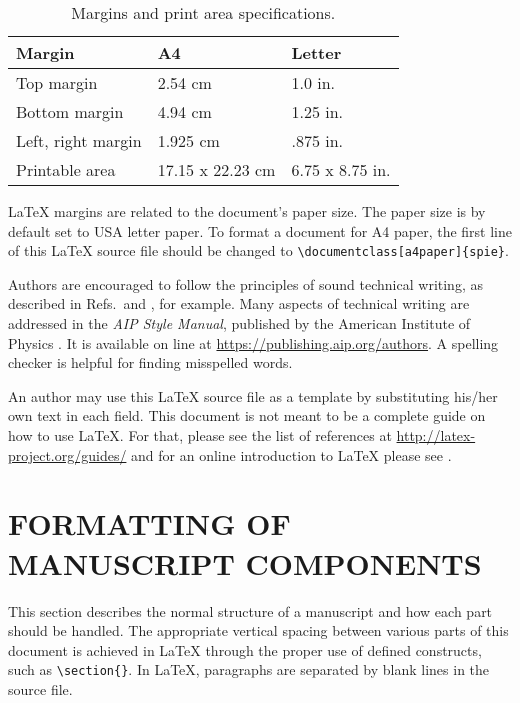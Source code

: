 \documentclass[]{spie}  %
\providecommand{\DIFdeltex}[1]{{\protect\color{mygrey}\scriptsize{#1}}}                       %
\providecommand{\DIFaddbegin}{} %
\providecommand{\DIFaddend}{} %
\providecommand{\DIFdelbegin}{} %
\providecommand{\DIFdelend}{} %
\providecommand{\DIFdel}[1]{\texorpdfstring{\DIFdeltex{#1}}{}} %
\newcommand{\DIFscaledelfig}{0.5}
\newlength{\DIFdelgraphicswidth} %
\newlength{\DIFdelgraphicsheight} %
\newcommand{\DIFaddincludegraphics}[2][]{{\color{blue}\fbox{\DIFOincludegraphics[#1]{#2}}}} %
\newcommand{\DIFdelincludegraphics}[2][]{%
\sbox{\DIFdelgraphicsbox}{\DIFOincludegraphics[#1]{#2}}%
\settoboxwidth{\DIFdelgraphicswidth}{\DIFdelgraphicsbox} %
\settoboxtotalheight{\DIFdelgraphicsheight}{\DIFdelgraphicsbox} %
\scalebox{\DIFscaledelfig}{%
\parbox[b]{\DIFdelgraphicswidth}{\usebox{\DIFdelgraphicsbox}\\[-\baselineskip] \rule{\DIFdelgraphicswidth}{0em}}\llap{\resizebox{\DIFdelgraphicswidth}{\DIFdelgraphicsheight}{%
\setlength{\unitlength}{\DIFdelgraphicswidth}%
\begin{picture}(1,1)%
\thicklines\linethickness{2pt} %
{\color[rgb]{1,0,0}\put(0,0){\framebox(1,1){}}}%
{\color[rgb]{1,0,0}\put(0,0){\line( 1,1){1}}}%
{\color[rgb]{1,0,0}\put(0,1){\line(1,-1){1}}}%
\end{picture}%
}\hspace*{3pt}}} %
} %
\DeclareRobustCommand{\DIFaddbegin}{\DIFOaddbegin \let\includegraphics\DIFaddincludegraphics} %
\DeclareRobustCommand{\DIFaddend}{\DIFOaddend \let\includegraphics\DIFOincludegraphics} %
\DeclareRobustCommand{\DIFdelbegin}{\DIFOdelbegin \let\includegraphics\DIFdelincludegraphics} %
\DeclareRobustCommand{\DIFdelend}{\DIFOaddend \let\includegraphics\DIFOincludegraphics} %
\begin{document}
\begin{table}[ht]
\caption{Margins and print area specifications.} 
\label{tab:Paper Margins}
\begin{center}       
\begin{tabular}{|l|l|l|} 
\hline
\rule[-1ex]{0pt}{3.5ex}  Margin & A4 & Letter  \\
\hline
\rule[-1ex]{0pt}{3.5ex}  Top margin & 2.54 cm & 1.0 in.   \\
\hline
\rule[-1ex]{0pt}{3.5ex}  Bottom margin & 4.94 cm & 1.25 in.  \\
\hline
\rule[-1ex]{0pt}{3.5ex}  Left, right margin & 1.925 cm & .875 in.  \\
\hline
\rule[-1ex]{0pt}{3.5ex}  Printable area & 17.15 x 22.23 cm & 6.75 x 8.75 in.  \\
\hline 
\end{tabular}
\end{center}
\end{table}

LaTeX margins are related to the document's paper size. \DIFdelbegin \DIFdel{The paper size is by default set to USA letter paper. }\DIFdelend To format a document for A4 
paper, the first line of this LaTeX source file should be changed to 
\verb|\documentclass[a4paper]{spie}|.   

Authors are encouraged to follow the principles of sound technical writing, as described 
in Refs.~\DIFdelbegin \DIFdel{and }%
\DIFdelend , for example.  Many aspects of 
technical writing are addressed in the {\em AIP Style Manual}, published by the 
American Institute of Physics  \DIFaddbegin {}\DIFaddend .  It is available on 
line at \url{https://publishing.aip.org/authors}. A spelling checker is helpful for finding 
misspelled words. 

An author may use this LaTeX source file as a template by substituting his/her own text in each field.  This document is not meant to be a complete guide on how to use LaTeX.  For that, please see the list of references at \url{http://latex-project.org/guides/} and for an online introduction to LaTeX please see . 

\section{FORMATTING OF MANUSCRIPT COMPONENTS}

This section describes the normal structure of a manuscript and how each part should be handled.  The appropriate vertical spacing between various parts of this document is achieved in LaTeX through the proper use of defined constructs, such as \verb|\section{}|.  In LaTeX, paragraphs are separated by blank lines in the source file. 
\end{document}

